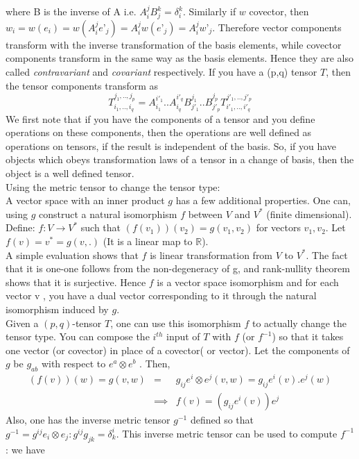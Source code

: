 \documentclass[a4paper]{report}
\theoremstyle{definition}
\theoremstyle{remark}
\begin{document}
		where B is the inverse of A i.e. $A_i^jB_j^k = \delta_i^k$. Similarly if $w$ covector, then $w_i=w(e_i)=w(A_i^je’_j) = A_i^jw(e’_j) = A_i^jw’_j$.
		Therefore vector components transform with the inverse transformation of the basis elements, while covector components transform in the same way as the basis elements. Hence they are also called \emph{contravariant} and \emph{covariant} respectively.
		If you have a (p,q) tensor $T$, then the tensor components transform as
		\begin{equation*}
			T_{i_1,..,i_q}^{j_1,..,j_p} = A^{i'_1}_{i_1}..A^{i'_q}_{i_q}B^{j_1}_{j'_1}..B^{j_p}_{j'_p}T^{j'_1,..,j'_p}_{i'_1,..,i'_q}
		\end{equation*}
		We first note that if you have the components of a tensor and you define operations on these components, then the operations are well defined as operations on tensors, if the result is independent of the basis. So, if you have objects which obeys transformation laws of a tensor in a change of basis, then the object is a well defined tensor.\\
		Using the metric tensor to change the tensor type:\\
		A vector space with an inner product $g$ has a few additional properties. One can, using $g$ construct a natural isomorphism $f$ between $V$ and $V^*$ (finite dimensional).
		Define: $f: V \to V^*$ such that $(f(v_1))(v_2)= g(v_1,v_2)$ for vectors $v_1,v_2$. Let $f(v)=v^*=g(v,.)$ (It is a linear map to $\mathbb{R}$).\\
		A simple evaluation shows that $f$ is linear transformation from $V$ to $V^*$. The fact that it is one-one follows from the non-degeneracy of g, and rank-nullity theorem shows that it is surjective. Hence $f$ is a vector space isomorphism and for each vector v , you have a dual vector corresponding to it through the natural isomorphism induced by $g$.\\
		Given a $(p,q)$-tensor $T$, one can use this isomorphism $f$ to actually change the tensor type. You can compose the $i^{th}$ input of $T$ with $f$ (or $f^{-1}$) so that it takes one vector (or covector) in place of a covector( or vector). Let the components of $g$ be $g_{ab}$ with respect to $e^{a}\otimes e^{b}$ . Then, 
		\begin{eqnarray*}
			(f(v))(w) = g(v,w) &=& g_{ij}e^i\otimes e^j(v,w)=g_{ij}e^i(v).e^j(w)\\ &\implies & f(v) =  (g_{ij}e^i(v))e^j 
		\end{eqnarray*}
		Also, one has the inverse metric tensor $g^{-1}$ defined so that $g^{-1}=g^{ij}e_i\otimes e_j : g^{ij}g_{jk} = \delta ^i_k$. This inverse metric tensor can be used to compute $f^{-1}$: we have 
\end{document}
